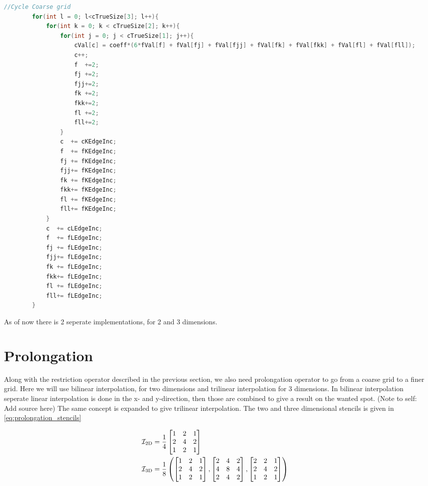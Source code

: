 	\newpage
	\begin{lstlisting}[language=c, caption = The foor loop doing the calculations]
		//Cycle Coarse grid
		for(int l = 0; l<cTrueSize[3]; l++){
			for(int k = 0; k < cTrueSize[2]; k++){
				for(int j = 0; j < cTrueSize[1]; j++){
					cVal[c] = coeff*(6*fVal[f] + fVal[fj] + fVal[fjj] + fVal[fk] + fVal[fkk] + fVal[fl] + fVal[fll]);
					c++;
					f  +=2;
					fj +=2;
					fjj+=2;
					fk +=2;
					fkk+=2;
					fl +=2;
					fll+=2;
				}
				c  += cKEdgeInc;
				f  += fKEdgeInc;
				fj += fKEdgeInc;
				fjj+= fKEdgeInc;
				fk += fKEdgeInc;
				fkk+= fKEdgeInc;
				fl += fKEdgeInc;
				fll+= fKEdgeInc;
			}
			c  += cLEdgeInc;
			f  += fLEdgeInc;
			fj += fLEdgeInc;
			fjj+= fLEdgeInc;
			fk += fLEdgeInc;
			fkk+= fLEdgeInc;
			fl += fLEdgeInc;
			fll+= fLEdgeInc;
		}
	\end{lstlisting}

	As of now there is 2 seperate implementations, for 2 and 3 dimensions.

\section{Prolongation}
	\label{sec:prol_simple}

	Along with the restriction operator described in the previous section, we also need prolongation
	operator to go from a coarse grid to a finer grid.	Here we will use bilinear interpolation, for
	two dimensions and trilinear interpolation for 3 dimensions. In bilinear interpolation seperate
	linear interpolation is done in the x- and y-direction, then those are combined to give a result
	on the wanted spot. (Note to self: Add source here) The same concept is expanded to give trilinear
	interpolation. The two and three dimensional stencils is given in \eqref{eq:prolongation_stencils}


	\begin{equation}
		\centering
		\begin{aligned}
			\mathcal{I}_{2\text{D}} &= \frac{1}{4}
			\begin{bmatrix}
				1 & 2 & 1
				\\
				2 & 4 & 2
				\\
				1 & 2 & 1
			\end{bmatrix}
			\\
			\mathcal{I}_{3\text{D}} &= \frac{1}{8} \left(
			\begin{bmatrix}
				1 & 2 & 1
				\\
				2 & 4 & 2
				\\
				1 & 2 & 1
			\end{bmatrix}
			,
			\begin{bmatrix}
				2 & 4 & 2
				\\
				4 & 8 & 4
				\\
				2 & 4 & 2
			\end{bmatrix}
			,
			\begin{bmatrix}
				2 & 2 & 1
				\\
				2 & 4 & 2
				\\
				1 & 2 & 1
			\end{bmatrix}
			\right)
			\label{eq:prolongation_stencils}
		\end{aligned}
	\end{equation}

